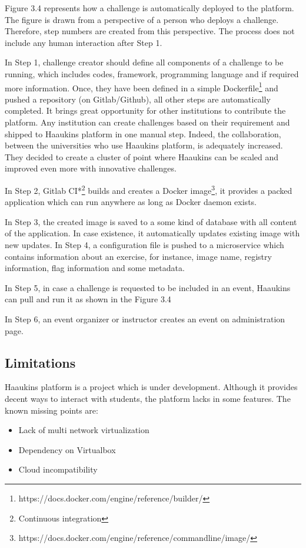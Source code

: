 Figure 3.4 represents how a challenge is automatically deployed to the platform. The figure is drawn from a perspective of a person who deploys a challenge. Therefore, step numbers are created from this perspective. The process does not include any human interaction after Step 1. 

In Step 1, challenge creator should define all components of a challenge to be running, which includes codes, framework, programming language and if required more information. Once, they have been defined in a simple Dockerfile\footnote{https://docs.docker.com/engine/reference/builder/} and pushed a repository (on Gitlab/Github), all other steps are automatically completed.  It brings great opportunity for other institutions to contribute the platform. Any institution can create challenges based on their requirement and shipped to Haaukins platform in one manual step. Indeed, the collaboration, between the universities who use Haaukins platform, is adequately increased. They decided to create a cluster of point where Haaukins can be scaled and improved even more with innovative challenges. 

In Step 2, Gitlab CI*\footnote{Continuous integration} builds and creates a Docker image\footnote{https://docs.docker.com/engine/reference/commandline/image/}, it provides a packed application which can run anywhere as long as Docker daemon exists. 

In Step 3, the created image is saved to a some kind of database with all content of the application. In case existence, it automatically updates existing image with new updates. 
In Step 4, a configuration file is pushed to a microservice which contains information about an exercise, for instance, image name, registry information, flag information and some metadata. 

In Step 5, in case a challenge is requested to be included in an event, Haaukins can pull and run it as shown in the Figure 3.4

In Step 6, an event organizer or instructor creates an event on administration page. 

\subsection{Limitations}
Haaukins platform is a project which is under development. Although it provides decent ways to interact with students, the platform lacks in some features. The known missing points are: 

\begin{itemize}
    \item Lack of multi network virtualization
    \item Dependency on Virtualbox
    \item Cloud incompatibility
\end{itemize}
 
